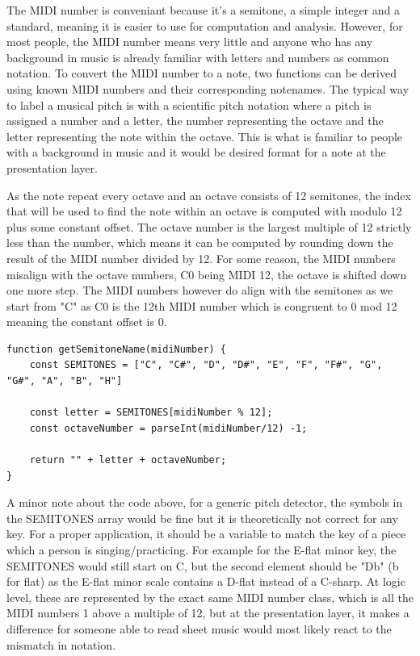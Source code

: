 The MIDI number is conveniant because it's a semitone, a simple integer and a standard, meaning it is easier to use for computation and analysis. However, for most people, the MIDI number means very little and anyone who has any background in music is already familiar with letters and numbers as common notation. To convert the MIDI number to a note, two functions can be derived using known MIDI numbers and their corresponding notenames. The typical way to label a musical pitch is with a scientific pitch notation where a pitch is assigned a number and a letter, the number representing the octave and the letter representing the note within the octave. This is what is familiar to people with a background in music and it would be desired format for a note at the presentation layer.

As the note repeat every octave and an octave consists of 12 semitones, the index that will be used to find the note within an octave is computed with modulo 12 plus some constant offset. The octave number is the largest multiple of 12 strictly less than the number, which means it can be computed by rounding down the result of the MIDI number divided by 12. For some reason, the MIDI numbers misalign with the octave numbers, C0 being MIDI 12, the octave is shifted down one more step. The MIDI numbers however do align with the semitones as we start from "C" as C0 is the 12th MIDI number which is congruent to 0 mod 12 meaning the constant offset is 0.
\begin{lstlisting}[style=javascript]
function getSemitoneName(midiNumber) {
    const SEMITONES = ["C", "C#", "D", "D#", "E", "F", "F#", "G", "G#", "A", "B", "H"]

    const letter = SEMITONES[midiNumber % 12];
    const octaveNumber = parseInt(midiNumber/12) -1;

    return "" + letter + octaveNumber; 
}
\end{lstlisting}
A minor note about the code above, for a generic pitch detector, the symbols in the SEMITONES array would be fine but it is theoretically not correct for any key.  For a proper application, it should be a variable to match the key of a piece which a person is singing/practicing. For example for the E-flat minor key, the SEMITONES would still start on C, but the second element should be "Db" (b for flat) as the E-flat minor scale contains a D-flat instead of a C-sharp. At logic level, these are represented by the exact same MIDI number class, which is all the MIDI numbers 1 above a multiple of 12, but at the presentation layer, it makes a difference for someone able to read sheet music would most likely react to the mismatch in notation.

